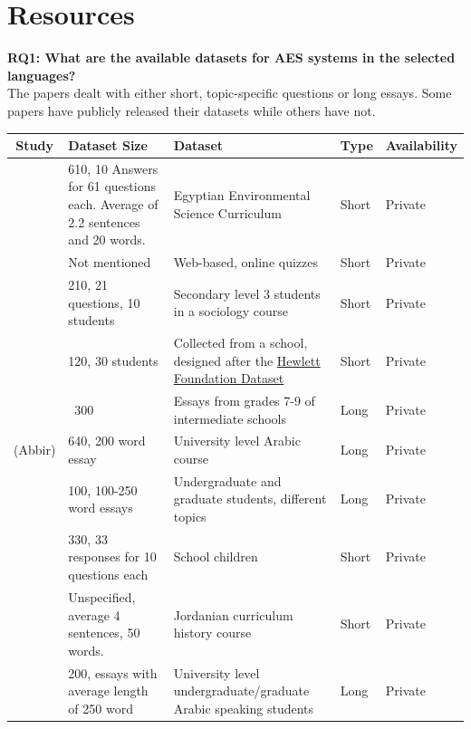 \documentclass{article}
\begin{document}
	\section{Resources}
	\textbf{RQ1: What are the available datasets for AES systems in the selected languages?} \\
	The papers dealt with either short, topic-specific questions or long essays. Some papers have publicly released their datasets while others have not.
	\begin{table}
		\centering
		\begin{tabularx}{7in}{|c|X|p{1.5in}|p{1cm}|p{1.5cm}|}
			\hline
			Study & Dataset Size & Dataset & Type & Availability \\ \hline
			\textcite{1_gomaa2014arabic} & 610, 10 Answers for 61 questions each.  Average of 2.2 sentences and 20 words. & Egyptian Environmental Science Curriculum & Short & Private \\ \hline
			\textcite{2_shalabi2016levenshtein} & Not mentioned & Web-based, online quizzes & Short & Private \footnotemark[1] \\ \hline
			\textcite{3_shehab2018arabicsimiliarity} & 210, 21 questions, 10 students & Secondary level 3 students in a sociology course & Short & Private \\ \hline
			\textcite{4_abdeljaber2021wordnet} & 120, 30 students & Collected from a school, designed after the \href{https://www.kaggle.com/c/asap-aes}{Hewlett Foundation Dataset} & Short & Private \\ \hline
			\textcite{5_aljouie2017schoolchildren} & ~300 & Essays from grades 7-9 of intermediate schools & Long & Private \\ \hline
			\textcite{6_ghamdi2014hybridarabic} (Abbir) & 640, 200 word essay & University level Arabic course & Long & Private \\ \hline
			\textcite{7_qahtani2019rulebased} & 100, 100-250 word essays & Undergraduate and graduate students, different topics & Long & Private \\ \hline
			\textcite{8_abdel2021lcs} & 330, 33 responses for 10 questions each & School children & Short & Private \footnotemark[2] \\ \hline
			\textcite{16_rababah2017short} & Unspecified, average 4 sentences, 50 words. & Jordanian curriculum history course & Short & Private \\ \hline
			\textcite{18_alqahtani2020svr} & 200, essays with average length of 250 word & University level undergraduate/graduate Arabic speaking students & Long & Private \\ \hline

\end{tabularx}
\end{table}
\end{document}
